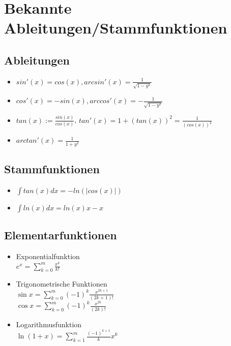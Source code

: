 \documentclass[german]{latex4ei/latex4ei_sheet}
\begin{document}
\section{Bekannte Ableitungen/Stammfunktionen}
	\begin{sectionbox}
		\subsection{Ableitungen}
		\begin{itemize}
			\item $sin'(x)=cos(x), arcsin'(x)=\frac{1}{\sqrt{1-y^2}}$
			\item  $cos'(x)=-sin(x), arccos'(x)=-\frac{1}{\sqrt{1-y^2}}$

			\item $tan(x):=\frac{sin(x)}{cos(x)}$, $tan'(x)=1+(tan(x))^2=\frac{1}{(cos(x))^2}$
			\item $arctan'(x)=\frac{1}{1+y^2}$
		\end{itemize}
		\subsection{Stammfunktionen}
		\begin{itemize}
			\item $\int tan(x)dx=-ln(|cos(x)|)$
			\item $\int ln(x)dx=ln(x)x-x$
		\end{itemize}
	\end{sectionbox}


    \subsection{Elementarfunktionen}
\begin{sectionbox}
    
	\begin{itemize}\itemsep-1pt
		\item Exponentialfunktion\\
		$e^x = \sum\limits_{k = 0}^m\frac{x^k}{k!}$
		\item Trigonometrische Funktionen\\
		$\sin{x} = \sum\limits_{k = 0}^m(-1)^k\frac{x^{2k + 1}}{(2k + 1)!}$\\
		$\cos{x} = \sum\limits_{k = 0}^m(-1)^k\frac{x^{2k}}{(2k)!}$
		\item Logarithmusfunktion\\
		$\ln{(1 + x)} = \sum\limits_{k = 1}^m\frac{(-1)^{k + 1}}{k}x^k$
	\end{itemize}
\end{sectionbox}
\end{document}
